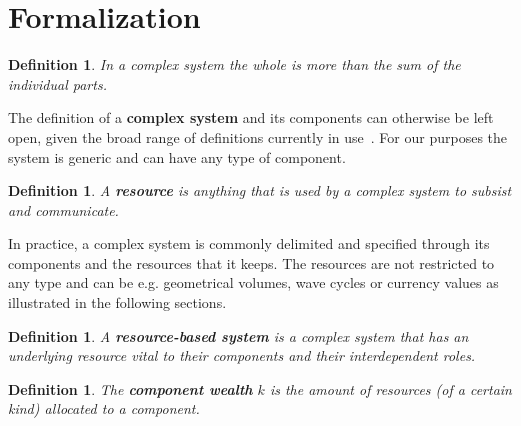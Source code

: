 \documentclass[a4paper, 11pt]{article} %
\newtheorem{definition2}[theorem3]{Definition}
\begin{document}
\section{Formalization}\label{sec:form}

\begin{definition2}
In a complex system the whole is more than the sum of the individual parts.
\end{definition2}

The definition of a {\bf complex system} and its components 
can otherwise be left open, given the broad range of definitions currently in use~\cite{complexity}.
For our purposes the system is generic and can have any type of component.


\begin{definition2}
	A {\bf resource} is anything that is used by a complex system to subsist and communicate.
\end{definition2}

In practice, a complex system is commonly delimited and specified through its components and the resources that it keeps. The resources are not restricted to any type and can be e.g. geometrical volumes, wave cycles or currency values as illustrated in the following sections.

\begin{definition2}
	A {\bf resource-based system} is a complex system that has an underlying resource vital to their components and their interdependent roles.
\end{definition2}


\begin{definition2}
	The {\bf component wealth} $k$ is the amount of resources (of a certain kind) allocated to a component.
\end{definition2}
\end{document}
